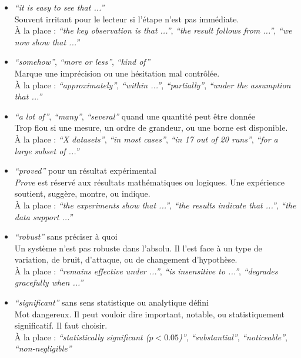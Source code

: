 \documentclass[11pt,a4paper]{article}
\theoremstyle{definition}
\begin{document}
\begin{itemize}
    \item \textit{``it is easy to see that ...''} \\
    Souvent irritant pour le lecteur si l'étape n'est pas immédiate. \\
    À la place : \textit{``the key observation is that ...''}, \textit{``the result follows from ...''}, \textit{``we now show that ...''}

    \item \textit{``somehow''}, \textit{``more or less''}, \textit{``kind of''} \\
    Marque une imprécision ou une hésitation mal contrôlée. \\
    À la place : \textit{``approximately''}, \textit{``within ...''}, \textit{``partially''}, \textit{``under the assumption that ...''}

    \item \textit{``a lot of''}, \textit{``many''}, \textit{``several''} quand une quantité peut être donnée \\
    Trop flou si une mesure, un ordre de grandeur, ou une borne est disponible. \\
    À la place : \textit{``X datasets''}, \textit{``in most cases''}, \textit{``in 17 out of 20 runs''}, \textit{``for a large subset of ...''}

    \item \textit{``proved''} pour un résultat expérimental \\
    \textit{Prove} est réservé aux résultats mathématiques ou logiques. Une expérience soutient, suggère, montre, ou indique. \\
    À la place : \textit{``the experiments show that ...''}, \textit{``the results indicate that ...''}, \textit{``the data support ...''}

    \item \textit{``robust''} sans préciser à quoi \\
    Un système n'est pas robuste dans l'absolu. Il l'est face à un type de variation, de bruit, d'attaque, ou de changement d'hypothèse. \\
    À la place : \textit{``remains effective under ...''}, \textit{``is insensitive to ...''}, \textit{``degrades gracefully when ...''}

    \item \textit{``significant''} sans sens statistique ou analytique défini \\
    Mot dangereux. Il peut vouloir dire important, notable, ou statistiquement significatif. Il faut choisir. \\
    À la place : \textit{``statistically significant ($p<0.05$)''}, \textit{``substantial''}, \textit{``noticeable''}, \textit{``non-negligible''}


\end{itemize}
\end{document}
